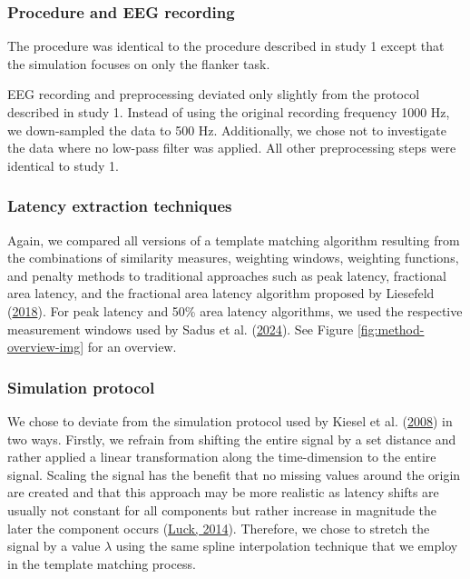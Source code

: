 \documentclass[
  man]{apa7}
\begin{document}
\hypertarget{procedure-and-eeg-recording}{%
\subsubsection{Procedure and EEG recording}\label{procedure-and-eeg-recording}}

The procedure was identical to the procedure described in study 1 except that the simulation focuses on only the flanker task.

EEG recording and preprocessing deviated only slightly from the protocol described in study 1. Instead of using the original recording frequency 1000 Hz, we down-sampled the data to 500 Hz. Additionally, we chose not to investigate the data where no low-pass filter was applied. All other preprocessing steps were identical to study 1.

\hypertarget{latency-extraction-techniques-1}{%
\subsubsection{Latency extraction techniques}\label{latency-extraction-techniques-1}}

Again, we compared all versions of a template matching algorithm resulting from the combinations of similarity measures, weighting windows, weighting functions, and penalty methods to traditional approaches such as peak latency, fractional area latency, and the fractional area latency algorithm proposed by Liesefeld (\protect\hyperlink{ref-liesefeld2018estimating}{2018}). For peak latency and 50\% area latency algorithms, we used the respective measurement windows used by Sadus et al. (\protect\hyperlink{ref-sadus2024explorative}{2024}). See Figure \ref{fig:method-overview-img} for an overview.

\hypertarget{simulation-protocol}{%
\subsubsection{Simulation protocol}\label{simulation-protocol}}

We chose to deviate from the simulation protocol used by Kiesel et al. (\protect\hyperlink{ref-kiesel2008measurement}{2008}) in two ways. Firstly, we refrain from shifting the entire signal by a set distance and rather applied a linear transformation along the time-dimension to the entire signal. Scaling the signal has the benefit that no missing values around the origin are created and that this approach may be more realistic as latency shifts are usually not constant for all components but rather increase in magnitude the later the component occurs (\protect\hyperlink{ref-luck2014introduction}{Luck, 2014}). Therefore, we chose to stretch the signal by a value \(\lambda\) using the same spline interpolation technique that we employ in the template matching process.
\end{document}
